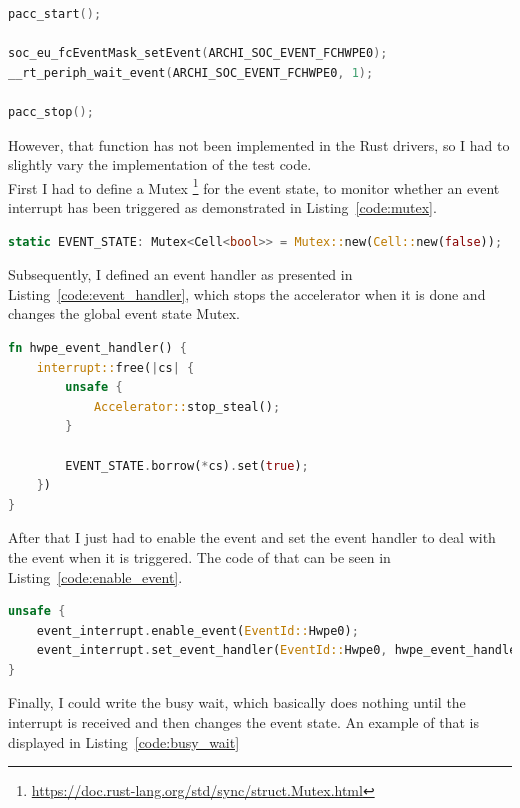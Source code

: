 \begin{lstlisting}[style=colorEX,language=C,caption={Waiting for the event in C},label={code:c_wait_for_event}]
pacc_start();

soc_eu_fcEventMask_setEvent(ARCHI_SOC_EVENT_FCHWPE0);
__rt_periph_wait_event(ARCHI_SOC_EVENT_FCHWPE0, 1);

pacc_stop();
\end{lstlisting}

However, that function has not been implemented in the Rust drivers, so I had to slightly
vary the implementation of the test code.\\
First I had to define a Mutex \footnote{\url{https://doc.rust-lang.org/std/sync/struct.Mutex.html}}
for the event state, to monitor whether an event interrupt has been triggered as demonstrated
in Listing~\ref{code:mutex}.

\begin{lstlisting}[style=colorEX,language=Rust,caption={Definition of the necessary Mutexes},label={code:mutex}]
static EVENT_STATE: Mutex<Cell<bool>> = Mutex::new(Cell::new(false));
\end{lstlisting}

Subsequently, I defined an event handler as presented in Listing~\ref{code:event_handler}, which
stops the accelerator when it is done and changes the global event state Mutex.

\begin{lstlisting}[style=colorEX,language=Rust,caption={Event handler function},label={code:event_handler}]
fn hwpe_event_handler() {
    interrupt::free(|cs| {
        unsafe {
            Accelerator::stop_steal();
        }

        EVENT_STATE.borrow(*cs).set(true);
    })
}
\end{lstlisting}

After that I just had to enable the event and set the event handler to deal with the event when it is triggered.
The code of that can be seen in Listing~\ref{code:enable_event}.

\begin{lstlisting}[style=colorEX,language=Rust,caption={Code to enable the hardware event and set the handler},label={code:enable_event}]
unsafe {
    event_interrupt.enable_event(EventId::Hwpe0);
    event_interrupt.set_event_handler(EventId::Hwpe0, hwpe_event_handler);
}
\end{lstlisting}

Finally, I could write the busy wait, which basically does nothing until the interrupt is received
and then changes the event state.
An example of that is displayed in Listing~\ref{code:busy_wait}

